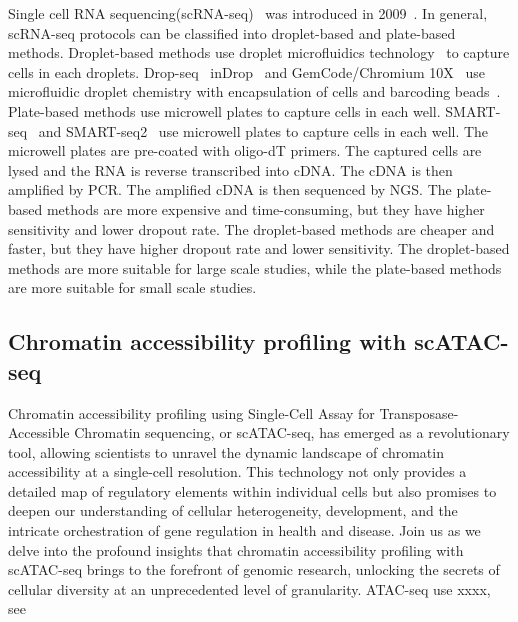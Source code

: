 Single cell RNA sequencing(scRNA-seq)~\citep{singlecellsequencing2014, singlecellsequencing2015} was introduced in 2009~\citep{tang2009mrna}. In general, scRNA-seq protocols can be classified into droplet-based and plate-based methods. Droplet-based methods use droplet microfluidics technology~\citep{dropletcompare2019, droplet2019practice} to capture cells in each droplets. Drop-seq~\citep{dropseq2015} inDrop~\citep{indrop2015} and GemCode/Chromium 10X~\citep{zheng2017massively} use microfluidic droplet chemistry with encapsulation of cells and barcoding beads~\citep{rotem2015high}. Plate-based methods use microwell plates to capture cells in each well. SMART-seq~\citep{smartseq2012} and SMART-seq2~\citep{smartseq22014} use microwell plates to capture cells in each well. The microwell plates are pre-coated with oligo-dT primers. The captured cells are lysed and the RNA is reverse transcribed into cDNA. The cDNA is then amplified by PCR. The amplified cDNA is then sequenced by NGS. The plate-based methods are more expensive and time-consuming, but they have higher sensitivity and lower dropout rate. The droplet-based methods are cheaper and faster, but they have higher dropout rate and lower sensitivity. The droplet-based methods are more suitable for large scale studies, while the plate-based methods are more suitable for small scale studies.
%


\subsection{Chromatin accessibility profiling with scATAC-seq}
Chromatin accessibility profiling using Single-Cell Assay for Transposase-Accessible Chromatin sequencing, or scATAC-seq, has emerged as a revolutionary tool, allowing scientists to unravel the dynamic landscape of chromatin accessibility at a single-cell resolution. This technology not only provides a detailed map of regulatory elements within individual cells but also promises to deepen our understanding of cellular heterogeneity, development, and the intricate orchestration of gene regulation in health and disease. Join us as we delve into the profound insights that chromatin accessibility profiling with scATAC-seq brings to the forefront of genomic research, unlocking the secrets of cellular diversity at an unprecedented level of granularity. ATAC-seq use xxxx, see  

